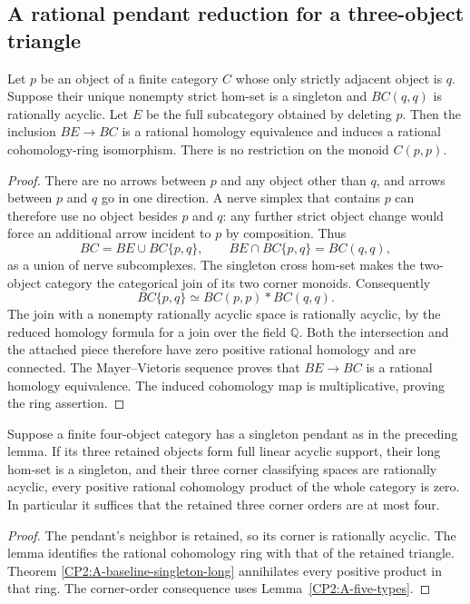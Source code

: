 \subsection{A rational pendant reduction for a three-object triangle}

\begin{lemma}
\label{CP2:A-rational-pendant-deletion}
Let $p$ be an object of a finite category $C$ whose only
strictly adjacent object is $q$. Suppose their unique nonempty
strict hom-set is a singleton and $BC(q,q)$ is rationally
acyclic. Let $E$ be the full subcategory obtained by deleting
$p$. Then the inclusion $BE\to BC$ is a rational homology
equivalence and induces a rational cohomology-ring isomorphism.
There is no restriction on the monoid $C(p,p)$.
\end{lemma}
\begin{proof}
There are no arrows between $p$ and any object other than $q$,
and arrows between $p$ and $q$ go in one direction. A nerve
simplex that contains $p$ can therefore use no object besides
$p$ and $q$: any further strict object change would force an
additional arrow incident to $p$ by composition. Thus
\[
 BC=BE\cup B C\{p,q\},\qquad
 BE\cap B C\{p,q\}=BC(q,q),
\]
as a union of nerve subcomplexes. The singleton cross hom-set
makes the two-object category the categorical join of its
two corner monoids. Consequently
\[
 B C\{p,q\}\simeq BC(p,p)*BC(q,q).
\]
The join with a nonempty rationally acyclic space is rationally
acyclic, by the reduced homology formula for a join over the
field $\mathbb Q$. Both the intersection and the attached
piece therefore have zero positive rational homology and are
connected. The Mayer--Vietoris sequence proves that
$BE\to BC$ is a rational homology equivalence. The induced
cohomology map is multiplicative, proving the ring assertion.
\end{proof}

\begin{corollary}
\label{CP2:A-pendant-singleton-long-triangle}
Suppose a finite four-object category has a singleton pendant
as in the preceding lemma. If its three retained objects
form full linear acyclic support, their long hom-set is a
singleton, and their three corner classifying spaces are
rationally acyclic, every positive rational cohomology product
of the whole category is zero. In particular it suffices
that the retained three corner orders are at most four.
\end{corollary}
\begin{proof}
The pendant's neighbor is retained, so its corner is rationally
acyclic. The lemma identifies the rational cohomology ring
with that of the retained triangle. Theorem
\ref{CP2:A-baseline-singleton-long} annihilates every positive
product in that ring. The corner-order consequence uses
Lemma~\ref{CP2:A-five-types}.
\end{proof}

